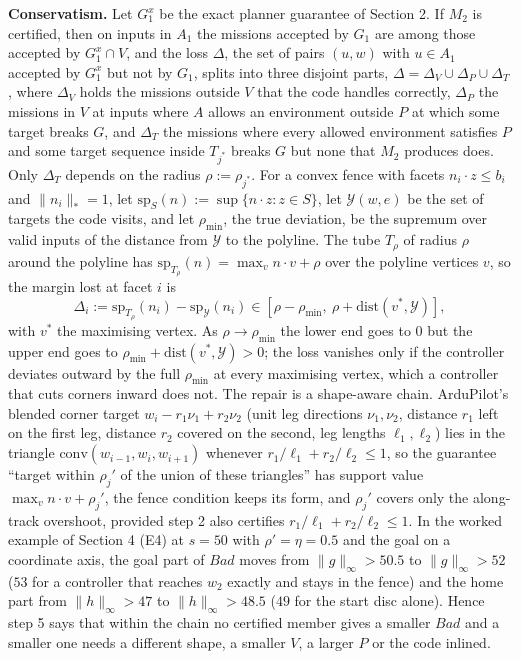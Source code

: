 \documentclass[10pt,a4paper]{article}
\newcommand{\Bad}{\mathit{Bad}}
\begin{document}
\textbf{Conservatism.} Let $G_1^x$ be the exact planner guarantee of Section 2. If $M_2$ is certified, then on inputs in $A_1$ the missions accepted by $G_1$ are among those accepted by $G_1^x\cap V$, and the loss $\Delta$, the set of pairs $(u,w)$ with $u\in A_1$ accepted by $G_1^x$ but not by $G_1$, splits into three disjoint parts, $\Delta=\Delta_V\cup\Delta_P\cup\Delta_T$, where $\Delta_V$ holds the missions outside $V$ that the code handles correctly, $\Delta_P$ the missions in $V$ at inputs where $A$ allows an environment outside $P$ at which some target breaks $G$, and $\Delta_T$ the missions where every allowed environment satisfies $P$ and some target sequence inside $T_{j^*}$ breaks $G$ but none that $M_2$ produces does. Only $\Delta_T$ depends on the radius $\rho:=\rho_{j^*}$. For a convex fence with facets $n_i\cdot z\le b_i$ and $\lVert n_i\rVert_*=1$, let $\mathrm{sp}_S(n):=\sup\{n\cdot z:z\in S\}$, let $\mathcal Y(w,e)$ be the set of targets the code visits, and let $\rho_{\min}$, the true deviation, be the supremum over valid inputs of the distance from $\mathcal Y$ to the polyline. The tube $T_\rho$ of radius $\rho$ around the polyline has $\mathrm{sp}_{T_\rho}(n)=\max_v n\cdot v+\rho$ over the polyline vertices $v$, so the margin lost at facet $i$ is
\[\Delta_i:=\mathrm{sp}_{T_\rho}(n_i)-\mathrm{sp}_{\mathcal Y}(n_i)\in[\rho-\rho_{\min},\ \rho+\mathrm{dist}(v^*,\mathcal Y)],\]
with $v^*$ the maximising vertex. As $\rho\to\rho_{\min}$ the lower end goes to $0$ but the upper end goes to $\rho_{\min}+\mathrm{dist}(v^*,\mathcal Y)>0$; the loss vanishes only if the controller deviates outward by the full $\rho_{\min}$ at every maximising vertex, which a controller that cuts corners inward does not. The repair is a shape-aware chain. ArduPilot's blended corner target $w_i-r_1\nu_1+r_2\nu_2$ (unit leg directions $\nu_1,\nu_2$, distance $r_1$ left on the first leg, distance $r_2$ covered on the second, leg lengths $\ell_1,\ell_2$) lies in the triangle $\mathrm{conv}(w_{i-1},w_i,w_{i+1})$ whenever $r_1/\ell_1+r_2/\ell_2\le1$, so the guarantee ``target within $\rho_j'$ of the union of these triangles'' has support value $\max_v n\cdot v+\rho_j'$, the fence condition keeps its form, and $\rho_j'$ covers only the along-track overshoot, provided step 2 also certifies $r_1/\ell_1+r_2/\ell_2\le1$. In the worked example of Section 4 (E4) at $s=50$ with $\rho'=\eta=0.5$ and the goal on a coordinate axis, the goal part of $\Bad$ moves from $\lVert g\rVert_\infty>50.5$ to $\lVert g\rVert_\infty>52$ ($53$ for a controller that reaches $w_2$ exactly and stays in the fence) and the home part from $\lVert h\rVert_\infty>47$ to $\lVert h\rVert_\infty>48.5$ ($49$ for the start disc alone). Hence step 5 says that within the chain no certified member gives a smaller $\Bad$ and a smaller one needs a different shape, a smaller $V$, a larger $P$ or the code inlined.
\end{document}
